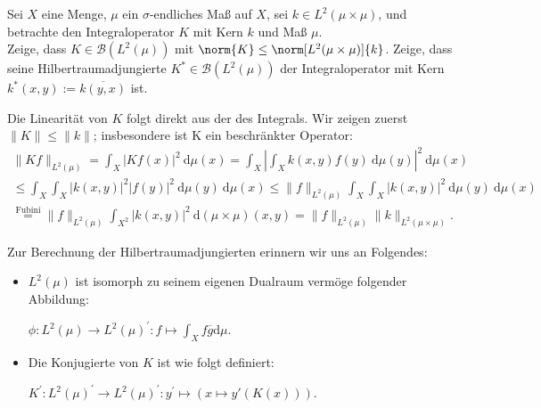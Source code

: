 \begin{exercise}[IO/1]

Sei $X$ eine Menge, $\mu$ ein $\sigma$-endliches Maß auf $X$, sei $k \in L^2(\mu \times \mu)$, und betrachte den Integraloperator $K$ mit Kern $k$ und Maß $\mu$. \\

Zeige, dass $K \in \mathcal{B}(L^2(\mu))$ mit $\norm{K} \leq \norm[L^2(\mu \times \mu)]{k}$.
Zeige, dass seine Hilbertraumadjungierte $K^\ast \in \mathcal{B}(L^2(\mu))$ der Integraloperator mit Kern $k^\ast(x, y) := \overline{k(y, x)}$ ist.

\end{exercise}

\begin{solution}
  Die Linearität von $K$ folgt direkt aus der des Integrals.
  Wir zeigen zuerst $\|K\| \leq \|k\|$; insbesondere ist K ein beschränkter Operator:
  \begin{align}
      \|Kf\|_{L^2(\mu)} = \int_X |Kf(x)|^2 ~\mathrm{d}\mu(x)
      = \int_X \left|\int_X k(x,y) f(y) ~\mathrm{d}\mu(y)\right|^2~\mathrm{d}\mu(x) \\
      \leq \int_X \int_X |k(x,y)|^2 |f(y)|^2 ~\mathrm{d}\mu(y)
      ~\mathrm{d}\mu(x) \leq \|f\|_{L^2(\mu)} \int_X \int_X |k(x,y)|^2 ~\mathrm{d}\mu(y) ~\mathrm{d}\mu(x) \\ \stackrel{\text{Fubini}}{=} \|f\|_{L^2(\mu)} \int_{X^2} |k(x,y)|^2 ~\mathrm{d}(\mu\times\mu)(x,y)
      = \|f\|_{L^2(\mu)} \|k\|_{L^2(\mu\times\mu)}.
  \end{align}

  Zur Berechnung der Hilbertraumadjungierten erinnern wir uns an Folgendes:

  \begin{itemize}
      \item $L^2(\mu)$ ist isomorph zu seinem eigenen Dualraum vermöge folgender Abbildung:

      $\phi: L^2(\mu) \rightarrow L^2(\mu)^\prime: f \mapsto \int_X f\overline{g} \mathrm{d}\mu.$
      \item Die Konjugierte von $K$ ist wie folgt definiert:

      $K^\prime: L^2(\mu)^\prime \rightarrow L^2(\mu)^\prime:
      y^\prime \mapsto (x \mapsto y'(K(x))).$
  \end{itemize}


\end{solution}
